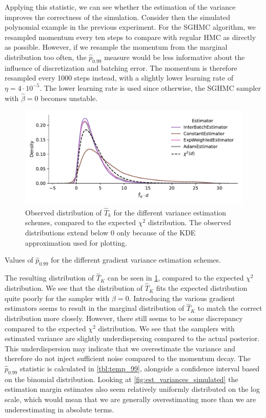 Applying this statistic, we can see whether the estimation of the variance improves the correctness of the simulation. 
Consider then the simulated polynomial example in the previous experiment.
For the SGHMC algorithm, we resampled momentum every ten steps to compare with regular HMC as directly as possible. 
However, if we resample the momentum from the marginal distribution too often, the $\hat{p}_{0.99}$ measure would be less informative about the influence of discretization and batching error. 
The momentum is therefore resampled every 1000 steps instead, with a slightly lower learning rate of $\eta=4 \cdot 10^{-5}$.
The lower learning rate is used since otherwise, the SGHMC sampler with $\hat{\beta}=0$ becomes unstable. 
\begin{figure}[htbp]
    \centering
    \includegraphics[width=\linewidth]{Figures/temperature_sum_chi2_comp.pdf}
    \caption{Observed distribution of $\hat{T}_k$ for the different variance estimation schemes, compared to the expected $\chi^2$ distribution.
The observed distributions extend below 0 only because of the KDE approximation used for plotting.}
    \label{fig:temperature_sum_chi2_comp}
\end{figure}
\begin{table}[htbp]
    \centering
    
    \caption{Values of $\hat{p}_{0.99}$ for the different gradient variance estimation schemes.}
    \label{tbl:temp_99}
\end{table}
The resulting distribution of $\hat{T}_K$ can be seen in \cref{fig:temperature_sum_chi2_comp}, compared to the expected $\chi^2$ distribution. 
We see that the distribution of $\hat{T}_K$ fits the expected distribution quite poorly for the sampler with $\beta=0$.
Introducing the various gradient estimators seems to result in the marginal distribution of $\hat{T}_K$ to match the correct distribution more closely.
However, there still seems to be some discrepancy compared to the expected $\chi^2$ distribution.
We see that the samplers with estimated variance are slightly underdispersing compared to the actual posterior. 
This underdispersion may indicate that we overestimate the variance and therefore do not inject sufficient noise compared to the momentum decay.
The $\hat p_{0.99}$ statistic is calculated in \cref{tbl:temp_99}, alongside a confidence interval based on the binomial distribution.
Looking at \cref{fig:est_variances_simulated} the estimation margin estimates also seem relatively uniformly distributed on the log scale, which would mean that we are generally overestimating more than we are underestimating in absolute terms.

